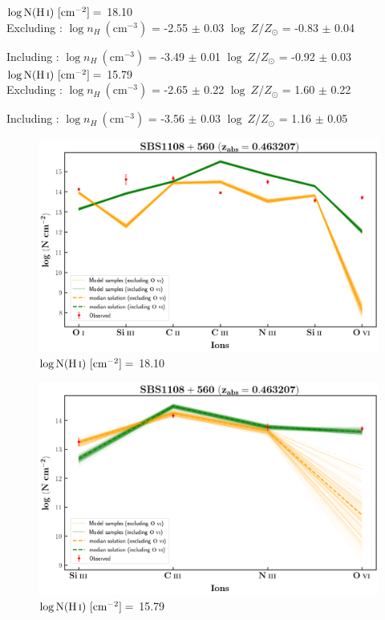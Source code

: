   
  $\log \text{N}(\ion{H}{i}) \ [\text{cm}^{-2}]=$ 18.10 \\
  
  Excluding  : $\log n_H \ (\text{cm}^{-3})$ = -2.55 $\pm$ 0.03 \hspace{10mm} $\log \ Z/Z_\odot$ = -0.83 $\pm$ 0.04
  
  Including  : $\log n_H \ (\text{cm}^{-3})$ = -3.49 $\pm$ 0.01 \hspace{10mm} $\log \ Z/Z_\odot$ = -0.92 $\pm$ 0.03
  \\
  
  $\log \text{N}(\ion{H}{i}) \ [\text{cm}^{-2}]=$ 15.79 \\
  
  Excluding  : $\log n_H \ (\text{cm}^{-3})$ = -2.65 $\pm$ 0.22 \hspace{10mm} $\log \ Z/Z_\odot$ = 1.60 $\pm$ 0.22
  
  Including  : $\log n_H \ (\text{cm}^{-3})$ = -3.56 $\pm$ 0.03 \hspace{10mm} $\log \ Z/Z_\odot$ = 1.16 $\pm$ 0.05
  
  
  \newpage
  
  \begin{figure}[!h]
    \centering
    \includegraphics[width=0.85\linewidth]{Ionisation-Modelling-Plots/sbs1108-z=0.463207-compIII_logZ=1.png}
    \caption{$\log \text{N}(\ion{H}{i}) \ [\text{cm}^{-2}]=$ 18.10}
  \end{figure}
  
  
  \begin{figure}[!b]
      \centering
      \includegraphics[width=0.85\linewidth]{Ionisation-Modelling-Plots/sbs1108-z=0.463207-compII_logZ=-1.png}
      \caption{$\log \text{N}(\ion{H}{i}) \ [\text{cm}^{-2}]=$ 15.79}
  \end{figure}
  
